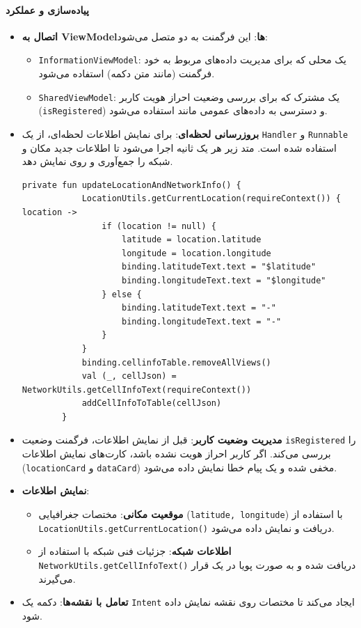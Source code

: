 \documentclass{report}
\begin{document}
\paragraph{پیاده‌سازی و عملکرد}

\begin{itemize}
	\item \textbf{اتصال به ViewModelها}: این فرگمنت به دو  متصل می‌شود:
	\begin{itemize}
		\item \texttt{InformationViewModel}: یک  محلی که برای مدیریت داده‌های مربوط به خود فرگمنت (مانند متن دکمه) استفاده می‌شود.
		\item \texttt{SharedViewModel}: یک  مشترک که برای بررسی وضعیت احراز هویت کاربر (\texttt{isRegistered}) و دسترسی به داده‌های عمومی مانند  استفاده می‌شود.
	\end{itemize}
	
	\item\textbf{بروزرسانی لحظه‌ای}: برای نمایش اطلاعات لحظه‌ای، از یک \texttt{Handler} و \texttt{Runnable} استفاده شده است. 
	متد زیر هر یک ثانیه اجرا می‌شود تا اطلاعات جدید مکان و شبکه را جمع‌آوری و روی  نمایش دهد.
	\begin{lstlisting}[mathescape=true]
		private fun updateLocationAndNetworkInfo() {
			LocationUtils.getCurrentLocation(requireContext()) { location ->
				if (location != null) {
					latitude = location.latitude
					longitude = location.longitude
					binding.latitudeText.text = "$latitude"
					binding.longitudeText.text = "$longitude"
				} else {
					binding.latitudeText.text = "-"
					binding.longitudeText.text = "-"
				}
			}
			binding.cellinfoTable.removeAllViews()
			val (_, cellJson) = NetworkUtils.getCellInfoText(requireContext())
			addCellInfoToTable(cellJson)
		}
	\end{lstlisting}
	
	
	\item \textbf{مدیریت وضعیت کاربر}: قبل از نمایش اطلاعات، فرگمنت وضعیت \texttt{isRegistered} را بررسی می‌کند. 
	اگر کاربر احراز هویت نشده باشد، کارت‌های نمایش اطلاعات (\texttt{locationCard} و \texttt{dataCard}) مخفی شده و یک پیام خطا نمایش داده می‌شود.
	
	\item \textbf{نمایش اطلاعات}:
	\begin{itemize}
		\item \textbf{موقعیت مکانی}: مختصات جغرافیایی (\texttt{latitude, longitude}) با استفاده از \texttt{LocationUtils.getCurrentLocation()} دریافت و نمایش داده می‌شود.
		\item \textbf{اطلاعات شبکه}: جزئیات فنی شبکه با استفاده از \texttt{NetworkUtils.getCellInfoText()} دریافت شده و به صورت پویا در یک  قرار می‌گیرند.
	\end{itemize}
	
	\item \textbf{تعامل با نقشه‌ها}: دکمه  یک \texttt{Intent} ایجاد می‌کند تا مختصات روی نقشه  نمایش داده شود.
\end{itemize}
\end{document}
